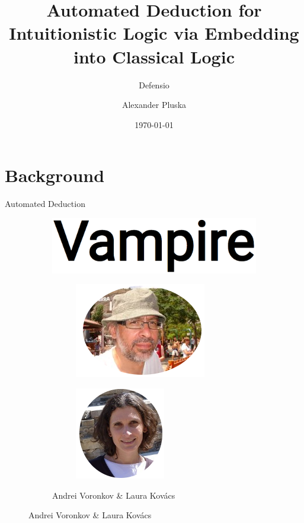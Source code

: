 \documentclass{cubeamer}
\title{Automated Deduction for Intuitionistic Logic via Embedding into Classical Logic}
\subtitle{Defensio}
\author[Alexander Pluska]{Alexander Pluska}
\date{\today} %
\institute[University of Vienna]{University of Vienna}
\begin{document}
	
	\maketitle
	
	\cutoc
	
	\section{Background}
	
	\begin{frame}{Automated Deduction}
			\begin{figure}[!tbp]
				\centering
				\begin{subfigure}[b]{0.35\textwidth}
					\begin{center}
						\includegraphics[width=\textwidth]{Vampire.png}
						\begin{subfigure}[b]{0.4\textwidth}
							\includegraphics[height=0.2\textheight]{Voronkov.png}
						\end{subfigure}
						\hfill
						\begin{subfigure}[b]{0.4\textwidth}
							\includegraphics[height=0.2\textheight]{Kovacs.png}
						\end{subfigure}
						\caption{Andrei Voronkov \& Laura Kovács}
					\end{center}

\end{subfigure}
\end{figure}
\end{frame}
\end{document}
